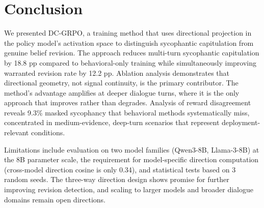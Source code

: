 \documentclass[11pt,a4paper]{article}
\begin{document}
\section{Conclusion}

We presented DC-GRPO, a training method that uses directional projection in the policy model's activation space to distinguish sycophantic capitulation from genuine belief revision. The approach reduces multi-turn sycophantic capitulation by 18.8 pp compared to behavioral-only training while simultaneously improving warranted revision rate by 12.2 pp. Ablation analysis demonstrates that directional geometry, not signal continuity, is the primary contributor. The method's advantage amplifies at deeper dialogue turns, where it is the only approach that improves rather than degrades. Analysis of reward disagreement reveals 9.3\% masked sycophancy that behavioral methods systematically miss, concentrated in medium-evidence, deep-turn scenarios that represent deployment-relevant conditions.

Limitations include evaluation on two model families (Qwen3-8B, Llama-3-8B) at the 8B parameter scale, the requirement for model-specific direction computation (cross-model direction cosine is only 0.34), and statistical tests based on 3 random seeds. The three-way direction design shows promise for further improving revision detection, and scaling to larger models and broader dialogue domains remain open directions.

%
\end{document}
